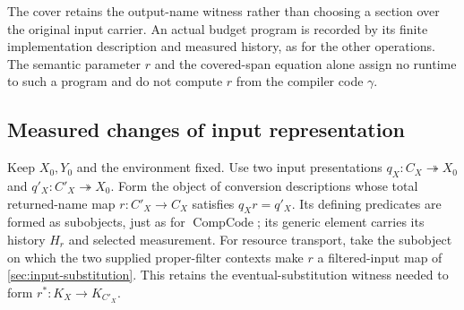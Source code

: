 \documentclass[11pt,a4paper]{article}
\numberwithin{algorithm}{section}
\numberwithin{equation}{section}
\theoremstyle{definition}
\theoremstyle{remark}
\theoremstyle{plain}
\newcommand{\onto}{\twoheadrightarrow}
\theoremstyle{definition}
\theoremstyle{plain}
\begin{document}
The cover retains the output-name witness rather than choosing a
section over the original input carrier. An actual budget program
is recorded by its finite implementation description and measured
history, as for the other operations. The semantic parameter $r$
and the covered-span equation alone assign no runtime to such a
program and do not compute $r$ from the compiler code $\gamma$.


\subsection{Measured changes of input representation}
\label{sec:measured-representation-change}
Keep $X_0,Y_0$ and the environment fixed. Use two input presentations
$q_X:C_X\onto X_0$ and $q'_X:C'_X\onto X_0$. Form the object of
conversion descriptions whose total returned-name map
$r:C'_X\to C_X$ satisfies $q_Xr=q'_X$. Its defining predicates are
formed as subobjects, just as for $\operatorname{CompCode}$; its generic
element carries its history $H_r$ and selected measurement.
For resource transport, take the subobject on which the two supplied
proper-filter contexts make $r$ a filtered-input map of
\cref{sec:input-substitution}. This retains the eventual-substitution
witness needed to form $r^*:K_X\to K_{C'_X}$.
\end{document}
